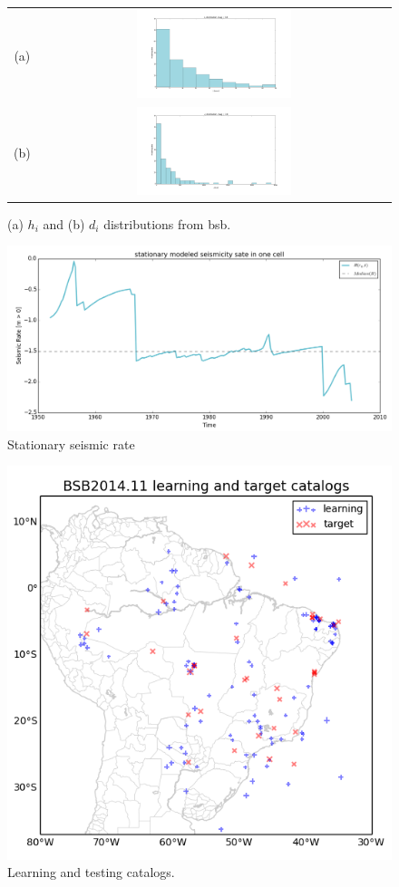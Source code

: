 \documentclass[draft, grl]{agutex}
\begin{document}
\begin{figure}
	\begin{center}
	\begin{table}[H]
		\begin{tabular}{ c c }
		\footnotesize(a)
		& \includegraphics[width=0.45\textwidth]{z_img_hi_histogram}
		\\
		\footnotesize(b)
        & \includegraphics[width=0.45\textwidth]{z_img_di_histogram}
		\end{tabular}
	\end{table}
	\caption{(a) $h_i$ and (b) $d_i$ distributions from \gls{bsb}.}
	\label{fig_hidi_histogram}
	\end{center}
\end{figure}



\begin{figure}
	\includegraphics[width=0.4\linewidth]{z_img_helmstetter_stationary_a}
	\caption{Stationary seismic rate}
	\label{fig_helmstetter_stationary_rate}
\end{figure}


\begin{figure}
	\includegraphics[width=0.4\linewidth]{z_img_helmstetter_catalogues}
	\caption{Learning and testing catalogs.}
	\label{fig_helmstetter_catalogues}
\end{figure}
\end{document}
